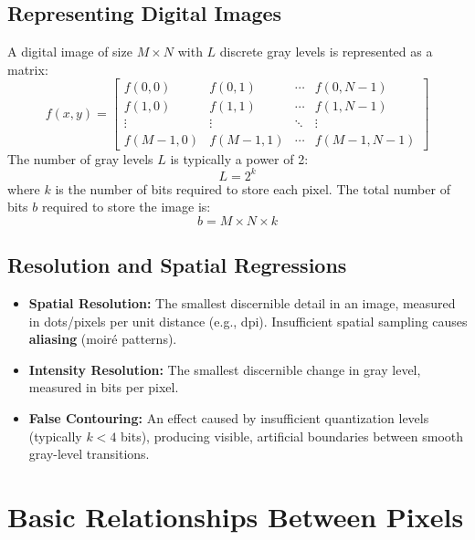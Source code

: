 \documentclass[12pt,a4paper]{article}
\begin{document}
\subsection{Representing Digital Images}
A digital image of size $M \times N$ with $L$ discrete gray levels is represented as a matrix:
\begin{equation}
  f(x,y) = \begin{bmatrix}
    f(0,0) & f(0,1) & \cdots & f(0,N-1) \\
    f(1,0) & f(1,1) & \cdots & f(1,N-1) \\
    \vdots & \vdots & \ddots & \vdots \\
    f(M-1,0) & f(M-1,1) & \cdots & f(M-1,N-1)
  \end{bmatrix}
\end{equation}
The number of gray levels $L$ is typically a power of 2:
\begin{equation}
  L = 2^k
\end{equation}
where $k$ is the number of bits required to store each pixel. The total number of bits $b$ required to store the image is:
\begin{equation}
  b = M \times N \times k
\end{equation}

\subsection{Resolution and Spatial Regressions}
\begin{itemize}[leftmargin=*, itemsep=3.5pt]
  \item \textbf{Spatial Resolution:} The smallest discernible detail in an image, measured in dots/pixels per unit distance (e.g., dpi). Insufficient spatial sampling causes \textbf{aliasing} (moir\'{e} patterns).
  \item \textbf{Intensity Resolution:} The smallest discernible change in gray level, measured in bits per pixel.
  \item \textbf{False Contouring:} An effect caused by insufficient quantization levels (typically $k < 4$ bits), producing visible, artificial boundaries between smooth gray-level transitions.
\end{itemize}

\section{Basic Relationships Between Pixels}
\end{document}
